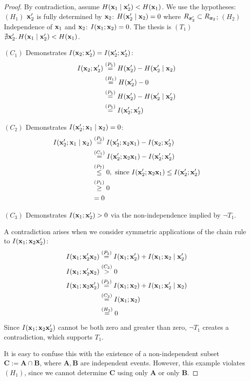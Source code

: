 \begin{proof}
By contradiction, assume $H({\mathbf{x}}_1 \mid {\mathbf{x}}_2') < H({\mathbf{x}}_1)$. We use the hypotheses: $(H_1)$ ${\mathbf{x}}_2'$ is fully determined by ${\mathbf{x}}_2$: $H({\mathbf{x}}_2' \mid {\mathbf{x}}_2) = 0$ where $R_{{\bm{x}}_2'} \subset R_{{\bm{x}}_2}$; $(H_2)$ Independence of ${\mathbf{x}}_1$ and ${\mathbf{x}}_2$: $I({\mathbf{x}}_1;{\mathbf{x}}_2) = 0$. The thesis is $(T_1)$ $\nexists {\mathbf{x}}_2'.\, H({\mathbf{x}}_1 \mid {\mathbf{x}}_2') < H({\mathbf{x}}_1)$.

$(C_1)$ Demonstrates $I({\mathbf{x}}_2;{\mathbf{x}}_2') = I({\mathbf{x}}_2';{\mathbf{x}}_2')$:
\begin{align*} I({\mathbf{x}}_2;{\mathbf{x}}_2') &\stackrel{\left(P_5\right)}{=} H({\mathbf{x}}_2') - H({\mathbf{x}}_2' \mid {\mathbf{x}}_2) \\ &\stackrel{\left(H_1\right)}{=} H({\mathbf{x}}_2') - 0 \\ &\stackrel{\left(P_5\right)}{=} H({\mathbf{x}}_2') - H({\mathbf{x}}_2' \mid {\mathbf{x}}_2') \\ &\stackrel{\left(P_5\right)}{=} I({\mathbf{x}}_2';{\mathbf{x}}_2') \end{align*}

$(C_2)$ Demonstrates $I({\mathbf{x}}_2';{\mathbf{x}}_1 \mid {\mathbf{x}}_2) = 0$:
\begin{align*} I({\mathbf{x}}_2';{\mathbf{x}}_1 \mid {\mathbf{x}}_2) &\stackrel{\left(P_2\right)}{=} I({\mathbf{x}}_2'; {\mathbf{x}}_2 {\mathbf{x}}_1) - I({\mathbf{x}}_2; {\mathbf{x}}_2') \\ &\stackrel{\left(C_1\right)}{=} I({\mathbf{x}}_2';{\mathbf{x}}_2 {\mathbf{x}}_1) - I({\mathbf{x}}_2';{\mathbf{x}}_2') \\ &\stackrel{\left(P_7\right)}{\leq} 0, \text{ since } I({\mathbf{x}}_2';{\mathbf{x}}_2 {\mathbf{x}}_1) \leq I({\mathbf{x}}_2';{\mathbf{x}}_2') \\ &\stackrel{\left(P_1\right)}{\geq} 0 \\ &= 0 \end{align*}

$(C_3)$ Demonstrates $I({\mathbf{x}}_1;{\mathbf{x}}_2') > 0$ via the non-independence implied by $\neg T_1$.

A contradiction arises when we consider symmetric applications of the chain rule to $I({\mathbf{x}}_1;{\mathbf{x}}_2 {\mathbf{x}}_2')$:
\begin{align*} I({\mathbf{x}}_1;{\mathbf{x}}_2' {\mathbf{x}}_2) &\stackrel{\left(P_2\right)}{=} I({\mathbf{x}}_1;{\mathbf{x}}_2') + I({\mathbf{x}}_1;{\mathbf{x}}_2 \mid {\mathbf{x}}_2') \\ I({\mathbf{x}}_1;{\mathbf{x}}_2' {\mathbf{x}}_2) &\stackrel{\left(C_3\right)}{>} 0 \\ I({\mathbf{x}}_1;{\mathbf{x}}_2 {\mathbf{x}}_2') &\stackrel{\left(P_2\right)}{=} I({\mathbf{x}}_1;{\mathbf{x}}_2) + I({\mathbf{x}}_1;{\mathbf{x}}_2' \mid {\mathbf{x}}_2) \\ &\stackrel{\left(C_2\right)}{=} I({\mathbf{x}}_1;{\mathbf{x}}_2) \\ &\stackrel{\left(H_2\right)}{=} 0 \end{align*}
Since $I({\mathbf{x}}_1;{\mathbf{x}}_2 {\mathbf{x}}_2')$ cannot be both zero and greater than zero, $\neg T_1$ creates a contradiction, which supports $T_1$.

It is easy to confuse this with the existence of a non-independent subset $\mathbf{C} := \mathbf{A} \cap \mathbf{B}$, where $\mathbf{A}, \mathbf{B}$ are independent events. However, this example violates $(H_1)$, since we cannot determine $\mathbf{C}$ using only $\mathbf{A}$ or only $\mathbf{B}$.
\end{proof}

